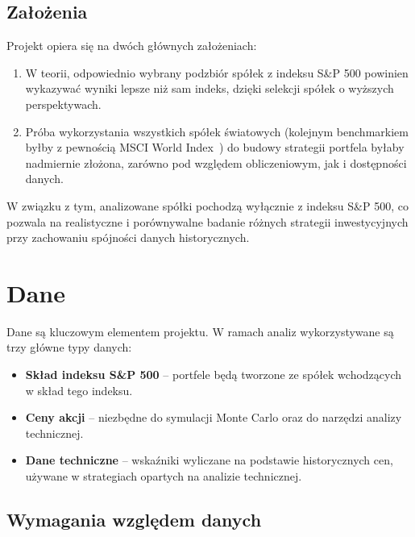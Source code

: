 \documentclass[12pt, a4paper]{article}
\begin{document}
\subsection{Założenia}

Projekt opiera się na dwóch głównych założeniach:
\begin{enumerate}
    \item W teorii, odpowiednio wybrany podzbiór spółek z indeksu S\&P 500 powinien wykazywać wyniki lepsze niż sam indeks, dzięki selekcji spółek o wyższych perspektywach.
    \item Próba wykorzystania wszystkich spółek światowych (kolejnym benchmarkiem byłby z pewnością MSCI World Index~\cite{msci:world}) do budowy strategii portfela byłaby nadmiernie złożona, zarówno pod względem obliczeniowym, jak i dostępności danych.
\end{enumerate}

W związku z tym, analizowane spółki pochodzą wyłącznie z indeksu S\&P 500, co pozwala na realistyczne i porównywalne badanie różnych strategii inwestycyjnych przy zachowaniu spójności danych historycznych.

\section{Dane}

Dane są kluczowym elementem projektu. W ramach analiz wykorzystywane są trzy główne typy danych:

\begin{itemize}
    \item \textbf{Skład indeksu S\&P 500} – portfele będą tworzone ze spółek wchodzących w skład tego indeksu.
    \item \textbf{Ceny akcji} – niezbędne do symulacji Monte Carlo oraz do narzędzi analizy technicznej.
    \item \textbf{Dane techniczne} – wskaźniki wyliczane na podstawie historycznych cen, używane w strategiach opartych na analizie technicznej.
\end{itemize}

\subsection{Wymagania względem danych}
\end{document}
